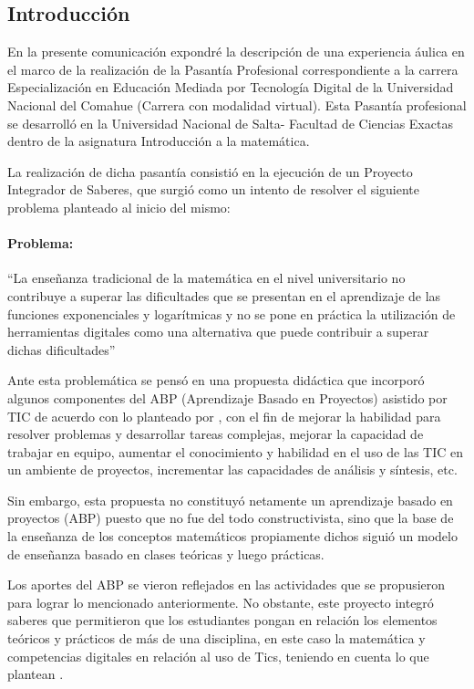 \subsection{Introducción}

En la presente comunicación expondré la descripción de una experiencia áulica en el marco de la realización de la Pasantía Profesional correspondiente a la carrera Especialización en Educación Mediada por Tecnología Digital de la Universidad Nacional del Comahue (Carrera con modalidad virtual). Esta Pasantía profesional se desarrolló en la Universidad Nacional de Salta- Facultad de Ciencias Exactas dentro de la asignatura Introducción a la matemática.

La realización de dicha pasantía consistió en la ejecución de un Proyecto Integrador de Saberes, que surgió como un intento de resolver el siguiente problema planteado al inicio del mismo:

\paragraph*{Problema:} “La enseñanza tradicional de la matemática en el nivel universitario no contribuye a superar las dificultades que se presentan en el aprendizaje de las funciones exponenciales y logarítmicas y no se pone en práctica la utilización de herramientas digitales como una alternativa que puede contribuir a superar dichas dificultades”

Ante esta problemática se pensó en una propuesta didáctica que incorporó algunos componentes del ABP (Aprendizaje Basado en Proyectos) asistido por TIC de acuerdo con lo planteado por \textcite{marti2010}, con el fin de mejorar la habilidad para resolver problemas y desarrollar tareas complejas, mejorar la capacidad de trabajar en equipo, aumentar el conocimiento y habilidad en el uso de las TIC en un ambiente de proyectos, incrementar las capacidades de análisis y síntesis, etc.

Sin embargo, esta propuesta no constituyó netamente un aprendizaje basado en proyectos (ABP) puesto que no fue del todo constructivista, sino que la base de la enseñanza de los conceptos matemáticos propiamente dichos siguió un modelo de enseñanza basado en clases teóricas y luego prácticas.

Los aportes del ABP se vieron reflejados en las actividades que se propusieron para lograr lo mencionado anteriormente. No obstante, este proyecto integró saberes que permitieron que los estudiantes pongan en relación los elementos teóricos y prácticos de más de una disciplina, en este caso la matemática y competencias digitales en relación al uso de Tics, teniendo en cuenta lo que plantean \textcite{torres2019}.

